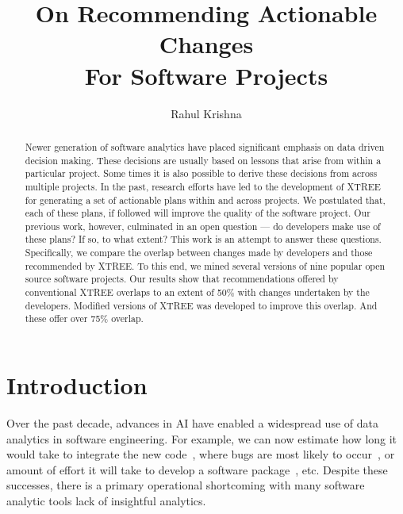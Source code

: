 \documentclass[sigconf, proceedings, 9pt]{acmart}
\begin{document}
\title{On Recommending Actionable Changes\\For Software Projects}
\author{Rahul Krishna}
\acmPrice{}

\begin{abstract}
Newer generation of software analytics have placed significant emphasis on data 
driven decision making. These decisions are usually based on 
lessons that arise from within a particular project. Some times it is also 
possible to derive these decisions from across multiple projects. In the past, 
research efforts have led to the development of XTREE 
for generating a set of actionable plans within and across projects. We 
postulated that, each of these plans, if followed will improve the quality of 
the software project. Our previous work, however, culminated in an open 
question --- do developers make use of these plans? If so, to what extent?
This work is an attempt to answer these questions. Specifically, we compare the 
overlap between changes made by developers and those recommended by XTREE. To 
this end, we mined several versions of nine popular open source software 
projects. Our results show that recommendations offered by conventional XTREE 
overlaps to an extent of 50\% with changes undertaken by the developers. 
Modified versions of XTREE was developed to improve this overlap. And these 
offer over 75\% overlap.

\end{abstract}

\maketitle

\section{Introduction}
\label{sect:intro}

Over the past decade, advances in AI have enabled a widespread use of data 
analytics in software engineering. For example, we can now estimate how long it 
would take to integrate the new code~\cite{czer11}, where bugs are most likely 
to occur~\cite{Menzies2007a}, or amount of effort it will take to develop a 
software package~\cite{turhan11}, etc. Despite these successes, there is a 
primary operational shortcoming with many software analytic tools lack 
of insightful analytics.
\end{document}
